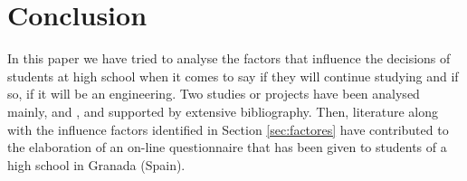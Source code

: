 \documentclass[journal,transmag]{IEEEtran}
\begin{document}
%

\section{Conclusion}
\label{sec:conclusions}

In this paper we have tried to analyse the factors that influence the decisions of students at high school when it comes to say if they will continue studying and if so, if it will be an engineering. Two studies or projects have been analysed mainly, \cite{everis2012} and \cite{mtg2015}, and supported by extensive bibliography. Then, literature along with the influence factors identified in Section \ref{sec:factores} have contributed to the elaboration of an on-line questionnaire that has been given to students of a high school in Granada (Spain).
\end{document}
